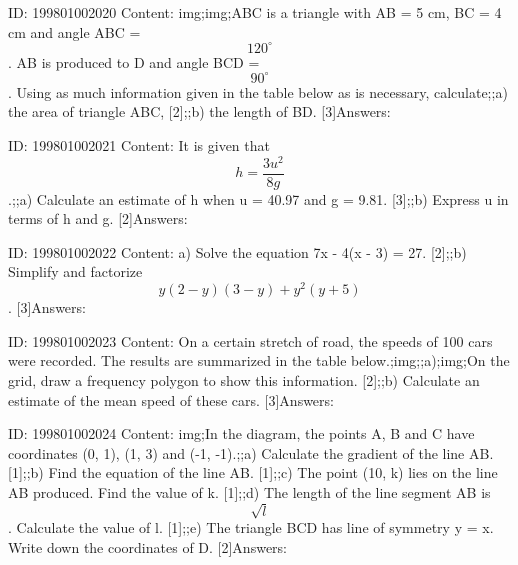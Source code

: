 \documentclass{article}
\begin{document}
ID: 199801002020
Content:
img;img;ABC is a triangle with AB = 5 cm, BC = 4 cm and angle ABC = $$120^{\circ}$$. AB is produced to D and angle BCD = $$90^{\circ}$$. Using as much information given in the table below as is necessary, calculate;;a) the area of triangle ABC, [2];;b) the length of BD. [3]Answers:

ID: 199801002021
Content:
It is given that $$h=\frac{3u^2}{8g}$$.;;a) Calculate an estimate of h when u = 40.97 and g = 9.81. [3];;b) Express u in terms of h and g. [2]Answers:

ID: 199801002022
Content:
a) Solve the equation 7x - 4(x - 3) = 27. [2];;b) Simplify and factorize $$y(2-y)(3-y)+y^2(y+5)$$. [3]Answers:

ID: 199801002023
Content:
On a certain stretch of road, the speeds of 100 cars were recorded. The results are summarized in the table below.;img;;a);img;On the grid, draw a frequency polygon to show this information. [2];;b) Calculate an estimate of the mean speed of these cars. [3]Answers:

ID: 199801002024
Content:
img;In the diagram, the points A, B and C have coordinates (0, 1), (1, 3) and (-1, -1).;;a) Calculate the gradient of the line AB. [1];;b) Find the equation of the line AB. [1];;c) The point (10, k) lies on the line AB produced. Find the value of k. [1];;d) The length of the line segment AB is $$\sqrt{l}$$. Calculate the value of l. [1];;e) The triangle BCD has line of symmetry y = x. Write down the coordinates of D. [2]Answers:
\end{document}
